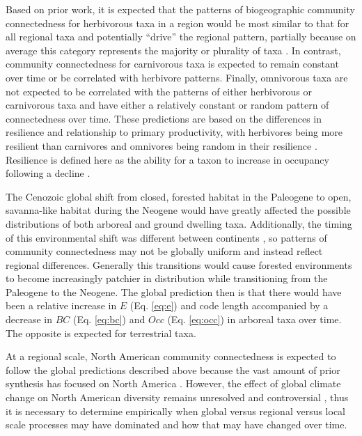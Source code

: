 \documentclass[12pt,letterpaper]{article}
\begin{document}
Based on prior work, it is expected that the patterns of biogeographic community connectedness for herbivorous taxa in a region would be most similar to that for all regional taxa and potentially ``drive'' the regional pattern, partially because on average this category represents the majority or plurality of taxa \citep{Jernvall2002}. In contrast, community connectedness for carnivorous taxa is expected to remain constant over time or be correlated with herbivore patterns. Finally, omnivorous taxa are not expected to be correlated with the patterns of either herbivorous or carnivorous taxa and have either a relatively constant or random pattern of connectedness over time.  These predictions are based on the differences in resilience and relationship to primary productivity, with herbivores being more resilient than carnivores and omnivores being random in their resilience \citep{Jernvall2004}. Resilience is defined here as the ability for a taxon to increase in occupancy following a decline \citep{Jernvall2004}.

The Cenozoic global shift from closed, forested habitat in the Paleogene to open, savanna-like habitat during the Neogene would have greatly affected the possible distributions of both arboreal and ground dwelling taxa. Additionally, the timing of this environmental shift was different between continents \citep{Stromberg2005,Stromberg2013}, so patterns of community connectedness may not be globally uniform and instead reflect regional differences. Generally this transitions would cause forested environments to become increasingly patchier in distribution while transitioning from the Paleogene to the Neogene. The global prediction then is that there would have been a relative increase in \(E\) (Eq. \ref{eq:e}) and code length accompanied by a decrease in \(BC\) (Eq. \ref{eq:bc}) and \(Occ\) (Eq. \ref{eq:occ}) in arboreal taxa over time. The opposite is expected for terrestrial taxa. 

At a regional scale, North American community connectedness is expected to follow the global predictions described above because the vast amount of prior synthesis has focused on North America \citep{Alroy2000g,Alroy1996a,Alroy1998,Barnosky2001a,Simpson1944,Simpson1953,Badgley2013,Blois2009,Figueirido2012,Gunnell1995,Hadly2001}. However, the effect of global climate change on North American diversity remains unresolved and controversial \citep{Alroy2000g,Blois2009,Figueirido2012,Barnosky2001a}, thus it is necessary to determine empirically when global versus regional versus local scale processes may have dominated and how that may have changed over time.
\end{document}
